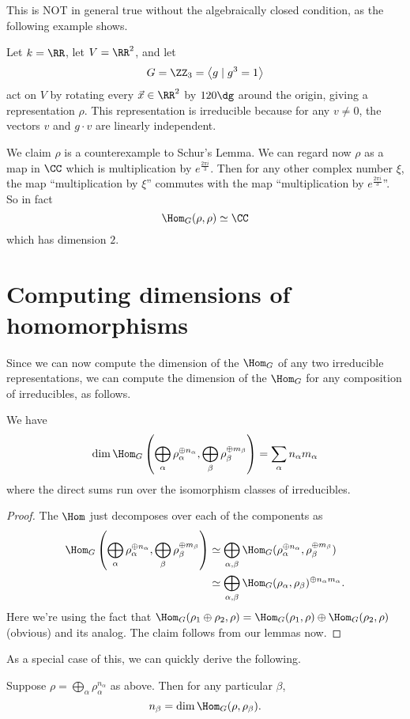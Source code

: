 This is NOT in general true without the algebraically closed condition, as the following example shows.
\begin{example}
	Let $k = \RR$, let $V = \RR^2$,
	and let \[ G = \ZZ_3 = \left<g \mid g^3=1\right> \]
	act on $V$ by rotating every $\vec x \in \RR^2$
	by $120\dg$ around the origin, giving a representation $\rho$.
	This representation is irreducible because for any $v \neq 0$,
	the vectors $v$ and $g \cdot v$ are linearly independent.

	We claim $\rho$ is a counterexample to Schur's Lemma.
	We can regard now $\rho$ as a map in $\CC$ which is multiplication by $e^{\frac{2\pi i}{3}}$.
	Then for any other complex number $\xi$, the map ``multiplication by $\xi$'' commutes with the map ``multiplication by $e^{\frac{2\pi i}{3}}$''.
	So in fact
	\[ \Hom_G(\rho, \rho) \simeq \CC \]
	which has dimension $2$.
\end{example}

\section{Computing dimensions of homomorphisms}
Since we can now compute the dimension of the $\Hom_G$ of any two irreducible representations,
we can compute the dimension of the $\Hom_G$ for any composition of irreducibles, as follows.
\begin{corollary}
	We have
	\[
		\dim \Hom_G
		\left( \bigoplus_\alpha \rho_\alpha^{\oplus n_\alpha},
		\bigoplus_\beta \rho_\beta^{\oplus m_\beta} \right)
		= \sum_{\alpha} n_\alpha m_\alpha
	\]
	where the direct sums run over the isomorphism classes of irreducibles.
\end{corollary}
\begin{proof}
	The $\Hom$ just decomposes over each of the components as
	\[
		\begin{aligned}
		\Hom_G
		\left( \bigoplus_\alpha \rho_\alpha^{\oplus n_\alpha},
		\bigoplus_\beta \rho_\beta^{\oplus m_\beta} \right)
		&\simeq
		\bigoplus_{\alpha, \beta}
		\Hom_G(\rho_\alpha^{\oplus n_\alpha}, \rho_\beta^{\oplus m_\beta}) \\
		&\simeq
		\bigoplus_{\alpha, \beta}
		\Hom_G(\rho_\alpha, \rho_\beta)^{\oplus n_\alpha m_\alpha}.
		\end{aligned}
	\]
	Here we're using the fact that $\Hom_G(\rho_1 \oplus \rho_2, \rho) = \Hom_G(\rho_1, \rho) \oplus \Hom_G(\rho_2, \rho)$ (obvious) and its analog.
	The claim follows from our lemmas now.
\end{proof}
As a special case of this, we can quickly derive the following.
\begin{corollary}
	Suppose $\rho = \bigoplus_\alpha \rho_\alpha^{n_\alpha}$ as above.
	Then for any particular $\beta$,
	\[ n_\beta = \dim \Hom_G(\rho, \rho_\beta). \]
\end{corollary}

